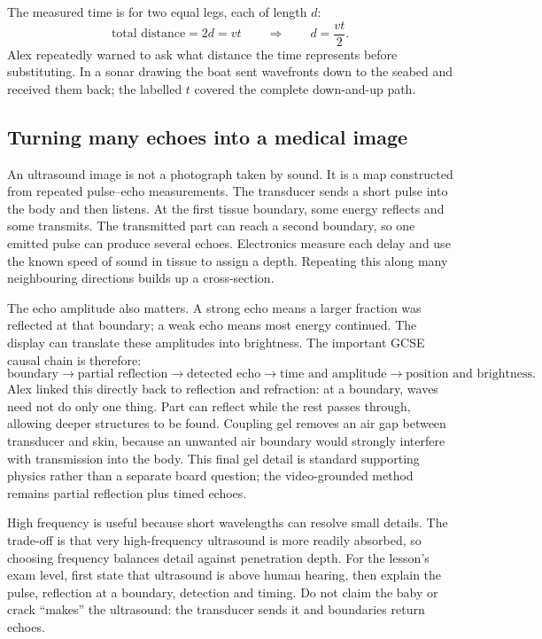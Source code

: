 \documentclass[11pt,a4paper]{article}
\begin{document}
The measured time is for two equal legs, each of length $d$:
\[
\text{total distance}=2d=vt\qquad\Longrightarrow\qquad d=\frac{vt}{2}.
\]
Alex repeatedly warned to ask what distance the time represents before substituting. In a sonar drawing the boat sent wavefronts down to the seabed and received them back; the labelled $t$ covered the complete down-and-up path.

\subsection{Turning many echoes into a medical image}
An ultrasound image is not a photograph taken by sound. It is a map constructed from repeated pulse--echo measurements. The transducer sends a short pulse into the body and then listens. At the first tissue boundary, some energy reflects and some transmits. The transmitted part can reach a second boundary, so one emitted pulse can produce several echoes. Electronics measure each delay and use the known speed of sound in tissue to assign a depth. Repeating this along many neighbouring directions builds up a cross-section.

The echo amplitude also matters. A strong echo means a larger fraction was reflected at that boundary; a weak echo means most energy continued. The display can translate these amplitudes into brightness. The important GCSE causal chain is therefore:
\[
\text{boundary}\to\text{partial reflection}\to\text{detected echo}\to\text{time and amplitude}\to\text{position and brightness}.
\]
Alex linked this directly back to reflection and refraction: at a boundary, waves need not do only one thing. Part can reflect while the rest passes through, allowing deeper structures to be found. Coupling gel removes an air gap between transducer and skin, because an unwanted air boundary would strongly interfere with transmission into the body. This final gel detail is standard supporting physics rather than a separate board question; the video-grounded method remains partial reflection plus timed echoes.

High frequency is useful because short wavelengths can resolve small details. The trade-off is that very high-frequency ultrasound is more readily absorbed, so choosing frequency balances detail against penetration depth. For the lesson's exam level, first state that ultrasound is above human hearing, then explain the pulse, reflection at a boundary, detection and timing. Do not claim the baby or crack ``makes'' the ultrasound: the transducer sends it and boundaries return echoes.
\end{document}
